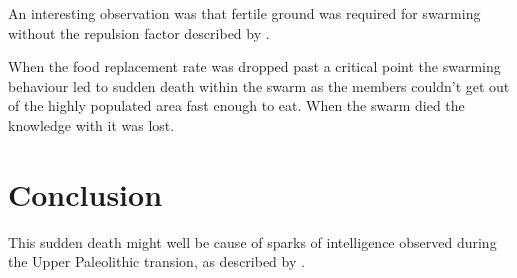 \documentclass[a4paper,12pt,twocolumn]{report}
\begin{document}
An interesting observation was that fertile ground was required for swarming without the repulsion factor described by \cite{agueh2011analysis}.

When the food replacement rate was dropped past a critical point the swarming behaviour led to sudden death within the swarm as the members couldn't get out of the highly populated area fast enough to eat. When the swarm died the knowledge with it was lost.

\section{Conclusion}

This sudden death might well be cause of sparks of intelligence observed during the Upper Paleolithic transion, as described by \cite{powell2009late}. 


\end{document}
